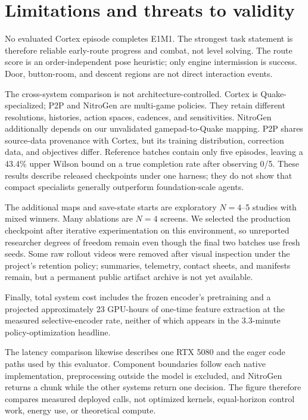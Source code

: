 \documentclass[11pt]{article}
\begin{document}
\section{Limitations and threats to validity}\label{sec:limits}

No evaluated Cortex episode completes E1M1. The strongest task statement is therefore reliable early-route progress and combat, not level solving. The route score is an order-independent pose heuristic; only engine intermission is success. Door, button-room, and descent regions are not direct interaction events.

The cross-system comparison is not architecture-controlled. Cortex is Quake-specialized; P2P and NitroGen are multi-game policies. They retain different resolutions, histories, action spaces, cadences, and sensitivities. NitroGen additionally depends on our unvalidated gamepad-to-Quake mapping. P2P shares source-data provenance with Cortex, but its training distribution, correction data, and objectives differ. Reference batches contain only five episodes, leaving a 43.4\% upper Wilson bound on a true completion rate after observing 0/5. These results describe released checkpoints under one harness; they do not show that compact specialists generally outperform foundation-scale agents.

The additional maps and save-state starts are exploratory $N{=}4$--5 studies with mixed winners. Many ablations are $N{=}4$ screens. We selected the production checkpoint after iterative experimentation on this environment, so unreported researcher degrees of freedom remain even though the final two batches use fresh seeds. Some raw rollout videos were removed after visual inspection under the project's retention policy; summaries, telemetry, contact sheets, and manifests remain, but a permanent public artifact archive is not yet available.

Finally, total system cost includes the frozen encoder's pretraining and a projected approximately 23 GPU-hours of one-time feature extraction at the measured selective-encoder rate, neither of which appears in the 3.3-minute policy-optimization headline.

The latency comparison likewise describes one RTX 5080 and the eager code paths used by this evaluator. Component boundaries follow each native implementation, preprocessing outside the model is excluded, and NitroGen returns a chunk while the other systems return one decision. The figure therefore compares measured deployed calls, not optimized kernels, equal-horizon control work, energy use, or theoretical compute.
\end{document}

